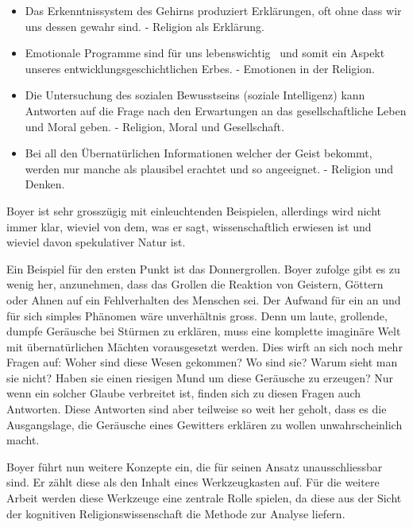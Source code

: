 \begin{itemize}
	\item Das Erkenntnissystem des Gehirns produziert Erklärungen, oft ohne dass wir uns dessen gewahr sind. - Religion als Erklärung.
	\item Emotionale Programme sind für uns lebenswichtig~ und somit ein Aspekt unseres entwicklungsgeschichtlichen Erbes. - Emotionen in der Religion.
	\item Die Untersuchung des sozialen Bewusstseins (soziale Intelligenz) kann Antworten auf die Frage nach den Erwartungen an das gesellschaftliche Leben und Moral geben. - Religion, Moral und Gesellschaft.
	\item Bei all den Übernatürlichen Informationen welcher der Geist bekommt, werden nur manche als plausibel erachtet und so angeeignet. - Religion und Denken.
\end{itemize}

Boyer ist sehr grosszügig mit einleuchtenden Beispielen, allerdings wird nicht immer klar, wieviel von dem, was er sagt, wissenschaftlich erwiesen ist und wieviel davon spekulativer Natur ist. 

Ein Beispiel für den ersten Punkt ist das Donnergrollen. Boyer zufolge gibt es zu wenig her, anzunehmen, dass das Grollen die Reaktion von Geistern, Göttern oder Ahnen auf ein Fehlverhalten des Menschen sei. Der Aufwand für ein an und für sich simples Phänomen wäre unverhältnis gross. Denn um laute, grollende, dumpfe Geräusche bei Stürmen zu erklären, muss eine komplette imaginäre Welt mit übernatürlichen Mächten vorausgesetzt werden. Dies wirft an sich noch mehr Fragen auf: Woher sind diese Wesen gekommen? Wo sind sie? Warum sieht man sie nicht? Haben sie einen riesigen Mund um diese Geräusche zu erzeugen? Nur wenn ein solcher Glaube verbreitet ist, finden sich zu diesen Fragen auch Antworten. Diese Antworten sind aber teilweise so weit her geholt, dass es die Ausgangslage, die Geräusche eines Gewitters erklären zu wollen unwahrscheinlich macht. 

Boyer führt nun weitere Konzepte ein, die für seinen Ansatz unausschliessbar sind. Er zählt diese als den Inhalt eines Werkzeugkasten auf. Für die weitere Arbeit werden diese Werkzeuge eine zentrale Rolle spielen, da diese aus der Sicht der kognitiven Religionswissenschaft die Methode zur Analyse liefern. 



